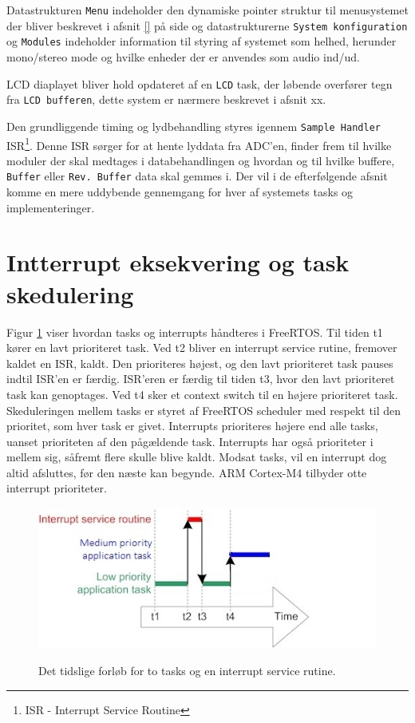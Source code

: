 Datastrukturen \texttt{Menu} indeholder den dynamiske pointer struktur til menusystemet der bliver beskrevet i afsnit \ref{} på side \pageref{} og datastrukturerne \texttt{System konfiguration} og \texttt{Modules} indeholder information til styring af systemet som helhed, herunder mono/stereo mode og hvilke enheder der er anvendes som audio ind/ud.

LCD diaplayet bliver hold opdateret af en \texttt{LCD} task, der løbende overfører tegn fra \texttt{LCD bufferen}, dette system er nærmere beskrevet i afsnit xx.

Den grundliggende timing og lydbehandling styres igennem \texttt{Sample Handler} ISR\footnote{ISR - Interrupt Service Routine}.
Denne ISR sørger for at hente lyddata fra ADC'en, finder frem til hvilke moduler der skal medtages i databehandlingen og hvordan og til hvilke buffere, \texttt{Buffer} eller \texttt{Rev. Buffer} data skal gemmes i.
Der vil i de efterfølgende afsnit komme en mere uddybende gennemgang for hver af systemets tasks og implementeringer. 


\section{Intterrupt eksekvering og task skedulering}
\label{subsec:int_task}
Figur \ref{fig:int_task} viser hvordan tasks og interrupts håndteres i FreeRTOS. 
Til tiden t1 kører en lavt prioriteret task. 
Ved t2 bliver en interrupt service rutine, fremover kaldet en ISR, kaldt. 
Den prioriteres højest, og den lavt prioriteret task pauses indtil ISR'en er færdig.
ISR'eren er færdig til tiden t3, hvor den lavt prioriteret task kan genoptages.
Ved t4 sker et context switch til en højere prioriteret task.
Skeduleringen mellem tasks er styret af FreeRTOS scheduler med respekt til den prioritet, som hver task er givet. 
Interrupts prioriteres højere end alle tasks, uanset prioriteten af den pågældende task. 
Interrupts har også prioriteter i mellem sig, såfremt flere skulle blive kaldt. 
Modsat tasks, vil en interrupt dog altid afsluttes, før den næste kan begynde. 
ARM Cortex-M4 tilbyder otte interrupt prioriteter. 
\begin{figure}[h]
	\caption{Det tidslige forløb for to tasks og en interrupt service rutine. }
	\centering
	\includegraphics[width=0.6\linewidth]{billeder/interruptandtaskprocessing.jpg}
	\label{fig:int_task}
\end{figure}

